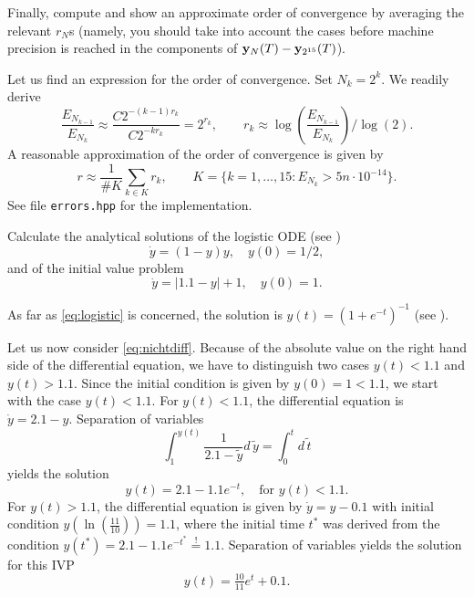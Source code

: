 \begin{problem}
\begin{subproblem}[3]
Finally, compute and show an approximate order of convergence by averaging the relevant
$r_N$s (namely, you should take into account the cases before machine precision is
reached in the components of ${\mathbf{y}}_N(T)-{\mathbf{y}}_{2^{15}}(T)$).
\begin{solution}
Let us find an expression for the order of convergence. Set $N_k=2^k$. We readily derive
\[
\frac{E_{N_{k-1}}}{E_{N_{k}}}\approx \frac{C 2^{-(k-1) r_k }}{C 2^{-k r_k}}=2^{r_k},\qquad r_k\approx \log\left( \frac{E_{N_{k-1}}}{E_{N_{k}}}\right) / \log(2).
\]
A reasonable approximation of the order of convergence is given by
\begin{equation}\label{eq:r}
r \approx \frac{1}{\# K}\sum_{k\in K} r_k,\qquad K=\{k=1,\dots,15:E_{N_k} >5n\cdot 10^{-14}\}.
\end{equation}
See file \texttt{errors.hpp} for the implementation.
\end{solution}
\end{subproblem}

\begin{subproblem}[3]\label{sp:analytic}
Calculate the analytical solutions of the logistic ODE (see )
\begin{equation}
	\label{eq:logistic}
	\dot{y} =(1-y)y,\quad y(0) = 1/2,
\end{equation}
and of the initial value problem 
\begin{equation}
	\label{eq:nichtdiff}
	\dot{y} = |{1.1-y}| + 1,\quad y(0) = 1.
\end{equation}

\begin{solution}
As far as \eqref{eq:logistic} is concerned, the solution is $y(t)=(1+e^{-t})^{-1}$ (see ).

Let us now consider \eqref{eq:nichtdiff}. Because of the absolute value on the right hand side of the differential equation, we have to distinguish two cases $y(t)<1.1$ and $y(t)>1.1$. Since the initial condition is given by $y(0) = 1< 1.1$, we start with the case $y(t)<1.1$. For $y(t)<1.1$, the differential equation is $\dot{y} = 2.1 - y$. Separation of variables
\begin{equation*}
	\int_1^{y(t)}\frac{1}{2.1-\tilde{y}} d\,\tilde{y} = \int_0^t d\,\tilde{t}
\end{equation*}
yields the solution
\begin{equation*}
	y(t) = 2.1 - 1.1 e^{-t},\quad \text{for $y(t) < 1.1$}.
\end{equation*}
For $y(t) > 1.1$, the differential equation is given by $\dot{y} = y-0.1$ with initial condition $y(\ln(\frac{11}{10})) = 1.1$, where the initial time $t^*$ was derived from the condition $y(t^*) = 2.1 - 1.1 e^{-t^*}\overset{\text{!}}{=} 1.1$. 
Separation of variables yields the solution for this IVP
\begin{equation*}
	y(t) = \tfrac{10}{11} e^t + 0.1.
\end{equation*}


\end{solution}
\end{subproblem}
\end{problem}

